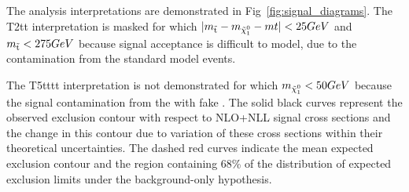 The analysis interpretations are demonstrated in Fig~\ref{fig:signal_diagrams}. The T2tt interpretation is masked for which $|m_{\tilde{{\mathrm t}}}-m_{\tilde{\chi}^{0}_{1}}-m{t}|<25GeV$ and $m_{\tilde{{\mathrm t}}}<275GeV$ because signal acceptance is difficult to model, due to the contamination from the standard model \ttbar events. 

The T5tttt interpretation is not demonstrated for which $m_{\tilde{\chi}^{0}_{1}}<50GeV$ because the signal contamination from the \ttbar with fake \MET.
The solid black curves represent the observed exclusion contour with respect to NLO+NLL signal cross sections and the change in this contour due to variation of these cross sections within their theoretical uncertainties\cite{Borschensky:2014cia}. The dashed red curves indicate the mean expected exclusion contour and the region containing 68\% of the distribution of expected exclusion limits under the background-only hypothesis. 

